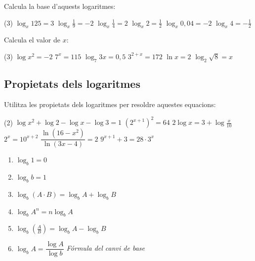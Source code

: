 \begin{mylist}
	\exer Calcula la base d'aquests logaritmes:
	\begin{tasks}(3)
		\task $\log_x 125 = 3$
		\task $\log_x \frac{1}{9}=-2$
		\task $\log_x \frac{1}{4} = 2$
		\task $\log_x 2 =\frac{1}{2}$
		\task $\log_x 0,04 = -2$
		\task $\log_x 4 = -\frac{1}{2}$
		\end{tasks}

\answers{[$x=5$, $x=3$, $x=\frac{1}{2}$, $x=4$, $x=5$, $x=\frac{1}{16}$]}

	\exer Calcula el valor de $x$:
\begin{tasks}(3)
	\task $\log x^2 = -2$
	\task $7^x = 115$
	\task $\log_7 3x = 0,5$
	\task $3^{2+x} = 172$
	\task $\ln x = 2$
	\task $\log_2 \sqrt{8}=x$
\end{tasks}

\answers{[$x=\pm\frac{1}{10}$, $x=\log_7 115\approx 2,438$, $x=\frac{\sqrt{7}}{3}\approx 0,882$, $x=-2+\log_3 172\approx 2,685$, $x=e^2\approx 7,389$, $x=\frac{3}{2}$]}

\end{mylist}

\subsection{Propietats dels logaritmes}


\begin{mylist}
	\exer[1]  Utilitza les propietats dels logaritmes per resoldre aquestes equacions:
	\begin{tasks}(2)
		\task $\log x^2 + \log 2 - \log x - \log 3 = 1$
		\task $(2^{x+1})^2 = 64$
		\task $2\log x = 3 +\log \frac{x}{10}$
		\task $2^x = 10^{x+2}$
		\task $\dfrac{\ln(16-x^2)}{\ln(3x-4)}=2$
		\task $9^{x+1} + 3 = 28\cdot 3^x$
	\end{tasks}
\answers[cols=1]{[$x=15$ ($x=0$ no vàlida), $x=2$, $x=100$ ($x=0$ no vàlida), $x=2/(\log 2 - 1)$, $x=12/5$,  $x=1$ i $x=-2$]}

\end{mylist}

\begin{theorybox}
 \begin{enumerate}
 	\item \label{eq:proplog} $\log_b 1 = 0$
 	\item $\log_b b = 1$
	\item $\log_b (A \cdot B) =  \log_b A + \log_b B$
	\item $\log_b A^n = n \log_b A$
	\item $\log_b \left( \frac{A}{B} \right) = \log_b A - \log_b B$
	\item $\log_b A = \dfrac{\log A}{\log b}$      \quad   \textit{Fórmula del canvi de base}	
 \end{enumerate}
\end{theorybox}





